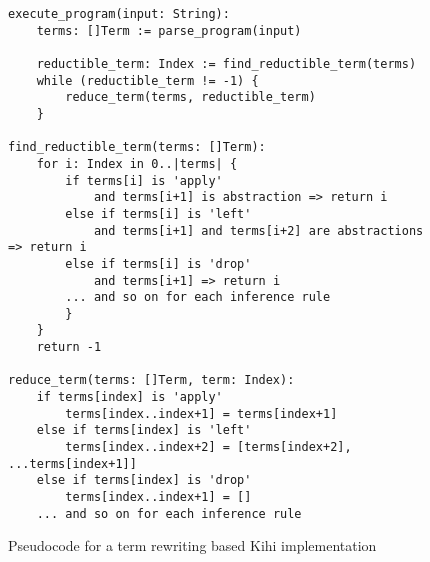 \begin{figure}[htb]
    \centering
    \begin{lstlisting}
execute_program(input: String):
    terms: []Term := parse_program(input)
    
    reductible_term: Index := find_reductible_term(terms)
    while (reductible_term != -1) {
        reduce_term(terms, reductible_term)
    }

find_reductible_term(terms: []Term):
    for i: Index in 0..|terms| {
        if terms[i] is 'apply'
            and terms[i+1] is abstraction => return i
        else if terms[i] is 'left'
            and terms[i+1] and terms[i+2] are abstractions => return i
        else if terms[i] is 'drop'
            and terms[i+1] => return i
        ... and so on for each inference rule
        }
    }
    return -1

reduce_term(terms: []Term, term: Index):
    if terms[index] is 'apply'
        terms[index..index+1] = terms[index+1]
    else if terms[index] is 'left'
        terms[index..index+2] = [terms[index+2], ...terms[index+1]]
    else if terms[index] is 'drop'
        terms[index..index+1] = []
    ... and so on for each inference rule
    \end{lstlisting}
    \caption{Pseudocode for a term rewriting based Kihi implementation}
    \label{fig:term_rewriting_pseudocode}
\end{figure}